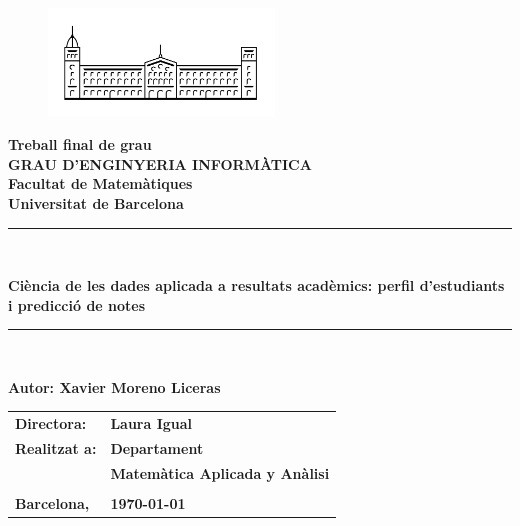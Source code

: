 \documentclass[12pt,a4paper,catalan]{article}
\newcommand{\titleTFG}{Ciència de les dades aplicada a resultats acadèmics: perfil d'estudiants i predicció de notes}
\newcommand{\myname}{Xavier Moreno Liceras}
\newcommand\blankpage{%
    \null
    \thispagestyle{empty}%
    \addtocounter{page}{-1}%
    \newpage}
\begin{document}
\thispagestyle{empty}

\begin{titlepage}
\begin{center}
\begin{figure}[h]
\begin{center}
\includegraphics[width=6cm]{img/ub.png}
\end{center}
\end{figure}

\textbf{\LARGE Treball final de grau} \\
\vspace*{.5cm}
\textbf{\LARGE GRAU D'ENGINYERIA INFORMÀTICA } \\
\vspace*{.5cm}
\textbf{\LARGE Facultat de Matemàtiques \\ Universitat de Barcelona} \\
\vspace*{1.5cm}
\rule{\textwidth}{0.1mm}\\
\begin{LARGE}
\textbf{\titleTFG} \\
\end{LARGE}
\rule{\textwidth}{0.1mm}\\

\vspace{1cm}

\begin{flushright}
\textbf{\LARGE Autor: \myname}

\vspace*{2cm}

\renewcommand{\arraystretch}{1.5}
\begin{tabular}{ll}
\textbf{\Large Directora:} & \textbf{\Large Laura Igual } \\
\textbf{\Large Realitzat a:} & \textbf{\Large  Departament   } \\
 & \textbf{\Large Matemàtica Aplicada y Anàlisi} \\
\\

\textbf{\Large Barcelona,} & \textbf{\Large \today }



\end{tabular}

\end{flushright}

\end{center}
\afterpage{\blankpage}
\end{titlepage}
\end{document}
